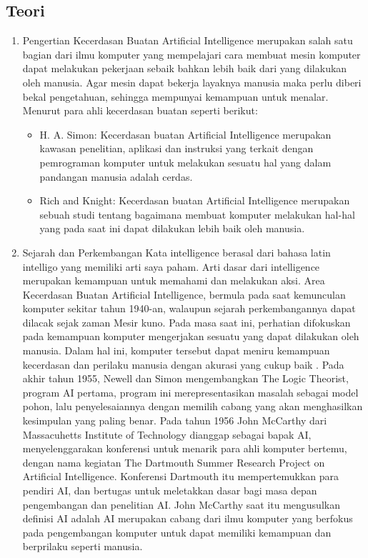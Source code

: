 \subsection{Teori}
\begin{enumerate}
\item
Pengertian
\subitem
Kecerdasan Buatan Artificial Intelligence merupakan salah satu bagian dari ilmu komputer yang mempelajari cara membuat mesin komputer dapat melakukan pekerjaan sebaik bahkan lebih baik dari yang dilakukan oleh manusia. Agar mesin dapat bekerja layaknya manusia maka perlu diberi bekal pengetahuan, sehingga mempunyai kemampuan untuk menalar. Menurut para ahli kecerdasan buatan seperti berikut:
\begin{itemize}
\item
H. A. Simon:
Kecerdasan buatan Artificial Intelligence merupakan kawasan penelitian, aplikasi dan instruksi yang terkait dengan pemrograman komputer untuk melakukan sesuatu hal yang dalam pandangan manusia adalah cerdas.
\item
Rich and Knight:
Kecerdasan buatan Artificial Intelligence merupakan sebuah studi tentang bagaimana membuat komputer melakukan hal-hal yang pada saat ini dapat dilakukan lebih baik oleh manusia.
\end{itemize}

\item
Sejarah dan Perkembangan
\subitem
Kata intelligence berasal dari bahasa latin intelligo yang memiliki arti saya paham. Arti dasar dari intelligence merupakan kemampuan untuk memahami dan melakukan aksi. Area Kecerdasan Buatan Artificial Intelligence, bermula pada saat kemunculan komputer sekitar tahun 1940-an, walaupun sejarah perkembangannya dapat dilacak sejak zaman Mesir kuno. Pada masa saat ini, perhatian difokuskan pada kemampuan komputer mengerjakan sesuatu yang dapat dilakukan oleh manusia. Dalam hal ini, komputer tersebut dapat meniru kemampuan kecerdasan dan perilaku manusia dengan akurasi yang cukup baik \cite{warwick2013artificial}.
\subitem
Pada akhir tahun 1955, Newell dan Simon mengembangkan The Logic Theorist, program AI pertama, program ini merepresentasikan masalah sebagai model pohon, lalu penyelesaiannya dengan memilih cabang yang akan menghasilkan kesimpulan yang paling benar. Pada tahun 1956 John McCarthy dari Massacuhetts Institute of Technology dianggap sebagai bapak AI, menyelenggarakan konferensi untuk menarik para ahli komputer bertemu, dengan nama kegiatan The Dartmouth Summer Research Project on Artificial Intelligence. Konferensi Dartmouth itu mempertemukkan para pendiri AI, dan bertugas untuk meletakkan dasar bagi masa depan pengembangan dan penelitian AI. John McCarthy saat itu mengusulkan definisi AI adalah AI merupakan cabang dari ilmu komputer yang berfokus pada pengembangan komputer untuk dapat memiliki kemampuan dan berprilaku seperti manusia\cite{bassil2012expert}.


\end{enumerate}
